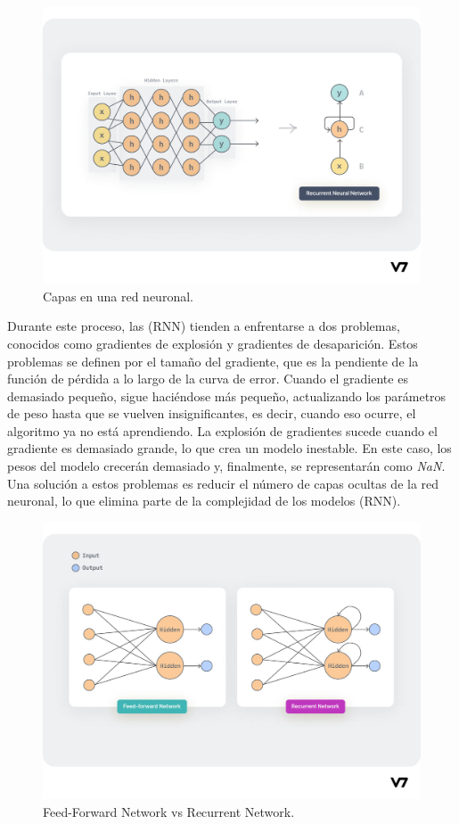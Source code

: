 \documentclass{article}
\begin{document}
\begin{figure}[H]
    \centering
    \includegraphics[scale=0.25]{capas.png}
    \caption{Capas en una red neuronal.}
\end{figure}

Durante este proceso, las (RNN) tienden a enfrentarse a dos problemas, conocidos como gradientes de explosión y gradientes de desaparición.
Estos problemas se definen por el tamaño del gradiente, que es la pendiente de la función de pérdida a lo largo de la curva de error.
Cuando el gradiente es demasiado pequeño, sigue haciéndose más pequeño, actualizando los parámetros de peso hasta que se vuelven insignificantes, es decir, cuando eso ocurre, el algoritmo ya no está aprendiendo.
La explosión de gradientes sucede cuando el gradiente es demasiado grande, lo que crea un modelo inestable.
En este caso, los pesos del modelo crecerán demasiado y, finalmente, se representarán como \textit{NaN}.
Una solución a estos problemas es reducir el número de capas ocultas de la red neuronal, lo que elimina parte de la complejidad de los modelos (RNN).

\begin{figure}[H]
    \centering
    \includegraphics[scale=0.25]{ffrn.png}
    \caption{Feed-Forward Network vs Recurrent Network.}
\end{figure}
\end{document}
